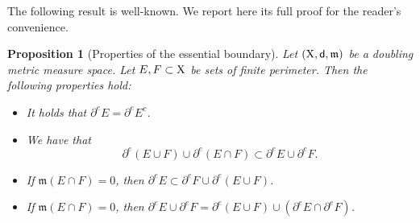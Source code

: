 \documentclass[reqno]{amsart}
\numberwithin{equation}{section}
\newcommand{\X}{{\rm X}}
\newcommand{\sfd}{{\sf d}}
\newcommand{\mm}{\mathfrak m}
\newcommand{\1}{\mathbbm 1}
\newtheorem{proposition}[theorem]{Proposition}
\begin{document}
%
%
The following result is well-known. We report here its full proof
for the reader's convenience.
%
%
\begin{proposition}[Properties of the essential boundary]\label{prop:properties_ess_bdry}
Let \((\X,\sfd,\mm)\) be a doubling metric measure space. Let \(E,F\subset\X\)
be sets of finite perimeter. Then the following properties hold:
\begin{itemize}
\item[\(\rm i)\)] It holds that \(\partial^e E=\partial^e E^c\).
\item[\(\rm ii)\)] We have that
\begin{equation}\label{eq:inclusion_ess_bdry}
\partial^e(E\cup F)\cup\partial^e(E\cap F)\subset\partial^e E\cup\partial^e F.
\end{equation}
\item[\(\rm iii)\)] If \(\mm(E\cap F)=0\), then
\(\partial^e E\subset\partial^e F\cup\partial^e(E\cup F)\).
\item[\(\rm iv)\)] If \(\mm(E\cap F)=0\), then
\(\partial^e E\cup\partial^e F=\partial^e(E\cup F)\cup(\partial^e E\cap\partial^e F)\).
\end{itemize}
\end{proposition}
\end{document}
